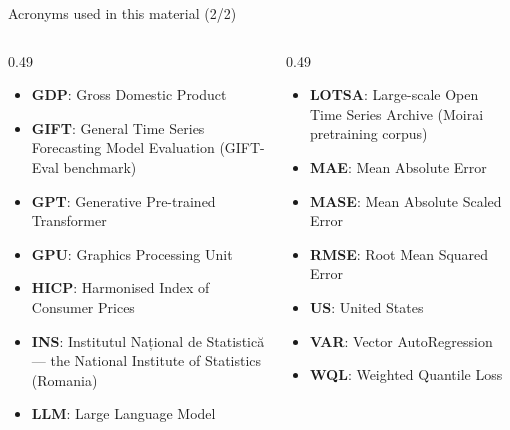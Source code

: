 \begin{frame}{Acronyms used in this material (2/2)}
\begin{columns}[T]
\begin{column}{0.49\textwidth}
\begin{itemize}\setlength{\itemsep}{0pt}
    \item \textbf{GDP}: Gross Domestic Product
    \item \textbf{GIFT}: General Time Series Forecasting Model Evaluation (GIFT-Eval benchmark)
    \item \textbf{GPT}: Generative Pre-trained Transformer
    \item \textbf{GPU}: Graphics Processing Unit
    \item \textbf{HICP}: Harmonised Index of Consumer Prices
    \item \textbf{INS}: Institutul Național de Statistică — the National Institute of Statistics (Romania)
    \item \textbf{LLM}: Large Language Model
\end{itemize}
\end{column}
\begin{column}{0.49\textwidth}
\begin{itemize}\setlength{\itemsep}{0pt}
    \item \textbf{LOTSA}: Large-scale Open Time Series Archive (Moirai pretraining corpus)
    \item \textbf{MAE}: Mean Absolute Error
    \item \textbf{MASE}: Mean Absolute Scaled Error
    \item \textbf{RMSE}: Root Mean Squared Error
    \item \textbf{US}: United States
    \item \textbf{VAR}: Vector AutoRegression
    \item \textbf{WQL}: Weighted Quantile Loss
\end{itemize}
\end{column}
\end{columns}
\end{frame}

